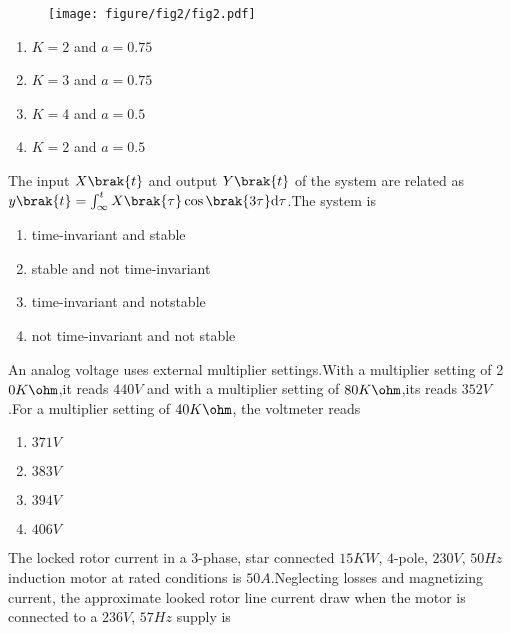 \begin{figure}[h!]
        \centering
        \texttt{[image: figure/fig2/fig2.pdf]}
		\caption{}
        \label{stemplot}
\end{figure}
     \begin{enumerate}
         \item$K=2$ and $a=0.75$\\
         \item$K=3$ and $a=0.75$\\
         \item$K=4$ and $a=0.5$\\
         \item$K=2$ and $a=0.5$
          \end{enumerate}
    \item The input $X\brak{t}$ and output $Y\brak{t}$ of the system are related as $y\brak{t}=\int_\infty^tX\brak{\tau}\cos\brak{3\tau}\mathrm{d}\tau$.The system is\\
    \begin{enumerate}
        \item time-invariant and stable\\
        \item stable and not time-invariant\\
         \item time-invariant and notstable\\
        \item not time-invariant and not stable
    \end{enumerate}
    \item An analog voltage uses external multiplier settings.With a multiplier setting of 2$0 K\ohm$,it reads $440 V$ and with a multiplier setting of $80 K\ohm$,its reads $352 V$.For a multiplier setting of $40 K\ohm$, the voltmeter reads\\
    \begin{enumerate}
        \item$371 V$\\
        \item$383 V$\\
        \item$394 V$\\
        \item$406 V$
    \end{enumerate}
    \item The locked rotor current in a $3$-phase, star connected $15 KW$, $4$-pole, $230 V$, $50Hz$ induction motor at rated conditions is $50 A$.Neglecting losses and magnetizing current, the approximate looked rotor line  current draw when the motor is connected to a $236 V$, $57 Hz$ supply is\\
